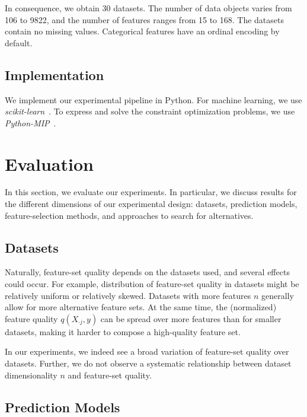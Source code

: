 \documentclass{article}
\theoremstyle{definition}
\begin{document}
In consequence, we obtain 30 datasets.
The number of data objects varies from 106 to 9822, and the number of features ranges from 15 to 168.
The datasets contain no missing values.
Categorical features have an ordinal encoding by default.

\subsection{Implementation}
\label{sec:experimental-design:implementation}

We implement our experimental pipeline in Python.
For machine learning, we use \emph{scikit-learn}~\cite{pedregosa2011scikit-learn}.
To express and solve the constraint optimization problems, we use \emph{Python-MIP}~\cite{python-mip}.

\section{Evaluation}
\label{sec:evaluation}

In this section, we evaluate our experiments.
In particular, we discuss results for the different dimensions of our experimental design:
datasets, prediction models, feature-selection methods, and approaches to search for alternatives.

\subsection{Datasets}

Naturally, feature-set quality depends on the datasets used, and several effects could occur.
For example, distribution of feature-set quality in datasets might be relatively uniform or relatively skewed.
Datasets with more features $n$ generally allow for more alternative feature sets.
At the same time, the (normalized) feature quality $q(X_{\cdot{}j},y)$ can be spread over more features than for smaller datasets, making it harder to compose a high-quality feature set.

In our experiments, we indeed see a broad variation of feature-set quality over datasets.
Further, we do not observe a systematic relationship between dataset dimensionality $n$ and feature-set quality.

\subsection{Prediction Models}
\end{document}

